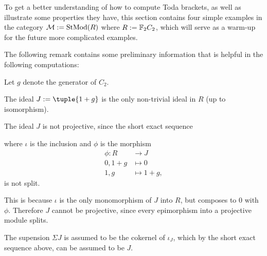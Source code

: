 To get a better understanding of how to compute Toda brackets, as well as illustrate some properties they have, this section contains four simple examples in the category \( {\mathcal{M}} := \operatorname{StMod}(R) \) where \( R := {\mathbb{F}}_2 C_2 \), which will serve as a warm-up for the future more complicated examples.

The following remark contains some preliminary information that is helpful in the following computations:

\begin{remark}
	\label{rem:toda_bracket_examples_properties}
    Let \( g \) denote the generator of \( C_2 \).

    The ideal \( J := \tuple{1 + g} \) is the only non-trivial ideal in \( R \) (up to isomorphism).

    The ideal \( J \) is not projective, since the short exact sequence
    \begin{center}
    \end{center}
    where \( \iota \) is the inclusion and \( \phi \) is the morphism
    \begin{align*}
        \phi: R &\to J \\
        0, 1 + g &\mapsto 0 \\
        1, g &\mapsto 1 + g,
    \end{align*}
    is not split.

    This is because \( \iota \) is the only monomorphism of \( J \) into \( R \), but composes to \( 0 \) with \( \phi \). Therefore \( J \) cannot be projective, since every epimorphism into a projective module splits.

    The supension \( \Sigma J \) is assumed to be the cokernel of \( \iota_J \), which by the short exact sequence above, can be assumed to be \( J \).

\end{remark}

